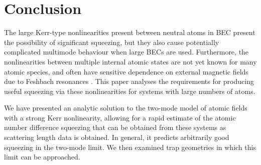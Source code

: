 \documentclass{iopart}
\begin{document}


\section{Conclusion}
\label{sectionConclusion}

The large Kerr-type nonlinearities present between neutral atoms in BEC present the possibility of significant squeezing, but they also cause potentially complicated multimode behaviour when large BECs are used.  Furthermore, the nonlinearities between multiple internal atomic states are not yet known for many atomic species, and often have sensitive dependence on external magnetic fields due to Feshbach resonances \cite{cornish:2000,altin:2010}.  This paper analyses the requirements for producing useful squeezing via these nonlinearities for systems with large numbers of atoms.  

We have presented an analytic solution to the two-mode model of atomic fields with a strong Kerr nonlinearity, allowing for a rapid estimate of the atomic number difference squeezing that can be obtained from these systems as scattering length data is obtained. In general, it predicts arbitrarily good squeezing in the two-mode limit. We then examined trap geometries in which this limit can be approached.
\end{document}
